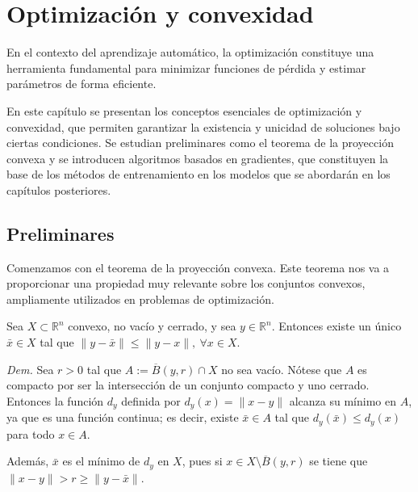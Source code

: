 
\chapter{Optimización y convexidad} \label{chap:optimizacion}

En el contexto del aprendizaje automático, la optimización constituye una herramienta fundamental para minimizar funciones de pérdida y estimar parámetros de forma eficiente.

En este capítulo se presentan los conceptos esenciales de optimización y convexidad, que permiten garantizar la existencia y unicidad de soluciones bajo ciertas condiciones. Se estudian preliminares como el teorema de la proyección convexa y se introducen algoritmos basados en gradientes, que constituyen la base de los métodos de entrenamiento en los modelos que se abordarán en los capítulos posteriores.



\section{Preliminares}
Comenzamos con el teorema de la proyección convexa. Este teorema nos va a proporcionar una propiedad muy relevante sobre los conjuntos convexos, ampliamente utilizados en problemas de optimización.

\begin{teorema} 
Sea $X \subset \mathbb{R}^n$ convexo, no vacío y cerrado, y sea $y \in \mathbb{R}^n$. Entonces existe un único $\bar{x} \in X$ tal que $\|y - \bar{x}\| \leq \|y - x\|,\ \forall x \in X$. \label{teo:proyeccion-convexa}
\end{teorema}

\vspace{0.2cm}

\textit{Dem.} Sea $r > 0$ tal que $A := \overline{B}(y,r) \cap X$ no sea vacío. Nótese que $A$ es compacto por ser la intersección de un conjunto compacto y uno cerrado. Entonces la función $d_y$ definida por $d_y(x) = \|x - y\|$ alcanza su mínimo en $A$, ya que es una función continua; es decir, existe $\bar{x} \in A$ tal que $d_y(\bar{x}) \leq d_y(x)$ para todo $x \in A$.

\vspace{0.2cm}

Además, $\bar{x}$ es el mínimo de $d_y$ en $X$, pues si $x \in X \setminus \overline{B}(y,r)$ se tiene que $\|x - y\| > r \geq \|y - \bar{x}\|$.

